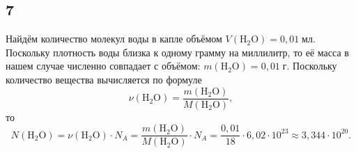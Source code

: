 \subsection{7}

Найдём количество молекул воды в капле объёмом $V(\mathrm{H_2O})=0{,}01\;\text{мл}$. Поскольку плотность воды близка к одному грамму на миллилитр, то её масса в нашем случае численно совпадает с объёмом: $m(\mathrm{H_2O})=0{,}01\;\text{г}$. Поскольку количество вещества вычисляется по формуле
\[
\nu(\mathrm{H_2O})=\frac{m(\mathrm{H_2O})}{M(\mathrm{H_2O})},
\]
то
\[
N(\mathrm{H_2O})=\nu(\mathrm{H_2O})\cdot N_A=\frac{m(\mathrm{H_2O})}{M(\mathrm{H_2O})}\cdot N_A=\frac{0{,}01}{18}\cdot6{,}02\cdot10^{23}\approx 3{,}344\cdot10^{20}.
\]